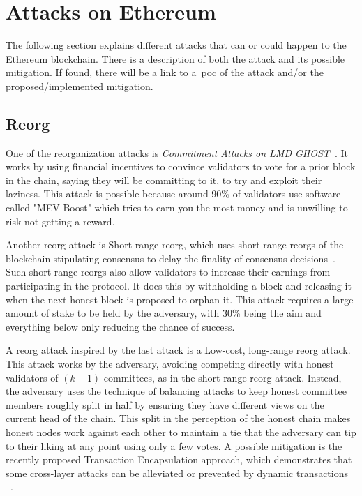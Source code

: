
\section{Attacks on Ethereum}\label{sec:attacks-on-ethereum}
The following section explains different attacks that can or could happen to the Ethereum blockchain.
There is a description of both the attack and its possible mitigation.
If found, there will be a link to a~\gls{poc} of the attack and/or the proposed/implemented mitigation.
\subsection{Reorg}\label{subsec:reorg}
One of the reorganization attacks is \textit{Commitment Attacks on LMD GHOST}~\cite{sarenche2024breakingbalancepowercommitment}.
It works by using financial incentives to convince validators to vote for a prior block in the chain, saying they will be committing to it, to try and exploit their laziness.
This attack is possible because around 90\% of validators use software called "MEV Boost" which tries to earn you the most money and is unwilling to risk not getting a reward.

Another reorg attack is Short-range reorg, which uses short-range reorgs of the blockchain stipulating consensus to delay the finality of consensus decisions~\cite{10.1007/978-3-031-18283-9_28}.
Such short-range reorgs also allow validators to increase their earnings from participating in the protocol.
It does this by withholding a block and releasing it when the next honest block is proposed to orphan it.
This attack requires a large amount of stake to be held by the adversary, with 30\% being the aim and everything below only reducing the chance of success.

A reorg attack inspired by the last attack is a Low-cost, long-range reorg attack\cite{10.1007/978-3-031-18283-9_28}.
This attack works by the adversary, avoiding competing directly with honest validators of $(k-1)$ committees, as in the short-range reorg attack.
Instead, the adversary uses the technique of balancing attacks to keep honest committee members roughly split in half by ensuring they have different views on the current head of the chain.
This split in the perception of the honest chain makes honest nodes work against each other to maintain a tie that the adversary can tip to their liking at any point using only a few votes.
A possible mitigation is the recently proposed Transaction Encapsulation approach, which demonstrates that some cross-layer attacks can be alleviated or prevented by dynamic transactions ~.


